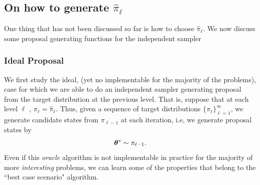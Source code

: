 \subsection{On how to generate $\hat{\pi}_\ell$}
\noindent One thing that has not been discussed so far is how to choose $\hat{\pi}_{\ell}$. We now discuss some proposal generating functions for the independent sampler
\subsubsection{Ideal Proposal}
We first study the ideal, (yet no implementable for the majority of the problems), case for which we are able to do an independent sampler generating proposal from the target distribution at the previous level. That is, suppose that at each level $\ell$ , $\pi_\ell=\hat{\pi}_\ell$. Thus, given a sequence of target distributions $\{\pi_\ell\}_{\ell=1}^\infty$, we generate candidate states from $\pi_{\ell-1}$ at each iteration, i.e, we generate proposal states by $$\bm{\theta}^*\sim \pi_{\ell-1}.$$ Even if this \textit{oracle} algorithm is not implementable in practice for the majority of more \textit{ interesting}
problems, we can learn some of the properties that belong to the ``best case scenario" algorithm.

